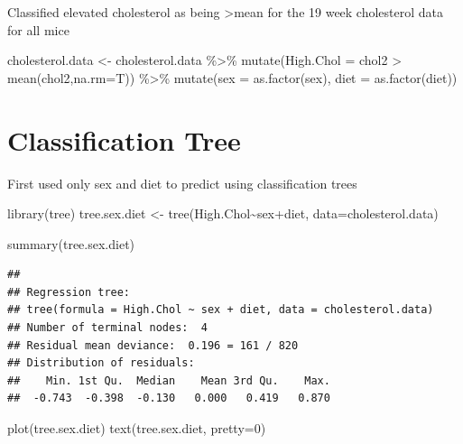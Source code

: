 \documentclass[
]{article}
\newenvironment{Shaded}{\begin{snugshade}}{\end{snugshade}}
\newcommand{\AttributeTok}[1]{\textcolor[rgb]{0.77,0.63,0.00}{#1}}
\newcommand{\DecValTok}[1]{\textcolor[rgb]{0.00,0.00,0.81}{#1}}
\newcommand{\FunctionTok}[1]{\textcolor[rgb]{0.00,0.00,0.00}{#1}}
\newcommand{\NormalTok}[1]{#1}
\newcommand{\OtherTok}[1]{\textcolor[rgb]{0.56,0.35,0.01}{#1}}
\newcommand{\SpecialCharTok}[1]{\textcolor[rgb]{0.00,0.00,0.00}{#1}}
\begin{document}
Classified elevated cholesterol as being \textgreater mean for the 19
week cholesterol data for all mice

\begin{Shaded}
\begin{Highlighting}[]
\NormalTok{cholesterol.data }\OtherTok{\textless{}{-}}
\NormalTok{  cholesterol.data }\SpecialCharTok{\%\textgreater{}\%}
  \FunctionTok{mutate}\NormalTok{(}\AttributeTok{High.Chol =}\NormalTok{ chol2 }\SpecialCharTok{\textgreater{}} \FunctionTok{mean}\NormalTok{(chol2,}\AttributeTok{na.rm=}\NormalTok{T)) }\SpecialCharTok{\%\textgreater{}\%}
  \FunctionTok{mutate}\NormalTok{(}\AttributeTok{sex =} \FunctionTok{as.factor}\NormalTok{(sex),}
         \AttributeTok{diet =} \FunctionTok{as.factor}\NormalTok{(diet))}
\end{Highlighting}
\end{Shaded}

\hypertarget{classification-tree}{%
\section{Classification Tree}\label{classification-tree}}

First used only sex and diet to predict using classification trees

\begin{Shaded}
\begin{Highlighting}[]
\FunctionTok{library}\NormalTok{(tree)}
\NormalTok{tree.sex.diet }\OtherTok{\textless{}{-}} \FunctionTok{tree}\NormalTok{(High.Chol}\SpecialCharTok{\textasciitilde{}}\NormalTok{sex}\SpecialCharTok{+}\NormalTok{diet, }\AttributeTok{data=}\NormalTok{cholesterol.data)}

\FunctionTok{summary}\NormalTok{(tree.sex.diet) }
\end{Highlighting}
\end{Shaded}

\begin{verbatim}
## 
## Regression tree:
## tree(formula = High.Chol ~ sex + diet, data = cholesterol.data)
## Number of terminal nodes:  4 
## Residual mean deviance:  0.196 = 161 / 820 
## Distribution of residuals:
##    Min. 1st Qu.  Median    Mean 3rd Qu.    Max. 
##  -0.743  -0.398  -0.130   0.000   0.419   0.870
\end{verbatim}

\begin{Shaded}
\begin{Highlighting}[]
\FunctionTok{plot}\NormalTok{(tree.sex.diet)}
\FunctionTok{text}\NormalTok{(tree.sex.diet, }\AttributeTok{pretty=}\DecValTok{0}\NormalTok{)}
\end{Highlighting}
\end{Shaded}
\end{document}
